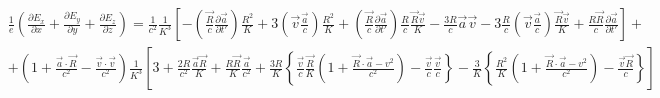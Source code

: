\documentclass[11pt]{article}
\begin{document}
\[\begin{align}
  & \frac{1}{e}\left( \frac{\partial {{E}_{x}}}{\partial x}+\frac{\partial {{E}_{y}}}{\partial y}+\frac{\partial {{E}_{z}}}{\partial z} \right)=\frac{1}{{{c}^{2}}}\frac{1}{{{K}^{3}}}\left[ -\left( \frac{\overrightarrow{R}}{c}\frac{\partial \overrightarrow{a}}{\partial t'} \right)\frac{{{R}^{2}}}{K}+3\left( \overrightarrow{v}\frac{\overrightarrow{a}}{c} \right)\frac{{{R}^{2}}}{K}+\left( \frac{\overrightarrow{R}}{c}\frac{\partial \overrightarrow{a}}{\partial t'} \right)\frac{R}{c}\frac{\overrightarrow{R}\overrightarrow{v}}{K}-\frac{3R}{c}\overrightarrow{a}\overrightarrow{v}-3\frac{R}{c}\left( \overrightarrow{v}\frac{\overrightarrow{a}}{c} \right)\frac{\overrightarrow{R}\overrightarrow{v}}{K}+\frac{R\overrightarrow{R}}{c}\frac{\partial \overrightarrow{a}}{\partial t'} \right]+ \\ 
 & +\left( 1+\frac{\overrightarrow{a}\cdot \overrightarrow{R}}{{{c}^{2}}}-\frac{\overrightarrow{v}\cdot \overrightarrow{v}}{{{c}^{2}}} \right)\frac{1}{{{K}^{3}}}\left[ 3+\frac{2R}{{{c}^{2}}}\frac{\overrightarrow{a}\overrightarrow{R}}{K}+\frac{R\overrightarrow{R}}{K}\frac{\overrightarrow{a}}{{{c}^{2}}}+\frac{3R}{K}\left\{ \frac{\overrightarrow{v}}{c}\frac{\overrightarrow{R}}{K}\left( 1+\frac{\overrightarrow{R}\cdot \overrightarrow{a}-{{v}^{2}}}{{{c}^{2}}} \right)-\frac{\overrightarrow{v}}{c}\frac{\overrightarrow{v}}{c} \right\}-\frac{3}{K}\left\{ \frac{{{R}^{2}}}{K}\left( 1+\frac{\overrightarrow{R}\cdot \overrightarrow{a}-{{v}^{2}}}{{{c}^{2}}} \right)-\frac{\overrightarrow{v}\overrightarrow{R}}{c} \right\} \right] \\ 
 &  \\ 
\end{align}\]
\end{document}
